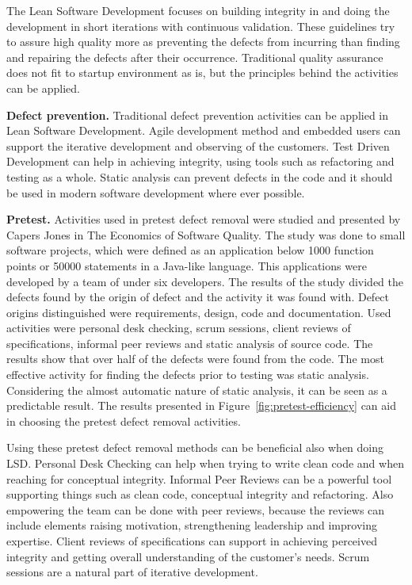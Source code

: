 
The Lean Software Development focuses on building integrity in and doing the development in short iterations with continuous validation. These guidelines try to assure high quality more as preventing the defects from incurring than finding and repairing the defects after their occurrence. Traditional quality assurance does not fit to startup environment as is, but the principles behind the activities can be applied.

\textbf{Defect prevention.} Traditional defect prevention activities can be applied in Lean Software Development. Agile development method and embedded users can support the iterative development and observing of the customers. Test Driven Development can help in achieving integrity, using tools such as refactoring and testing as a whole. Static analysis can prevent defects in the code and it should be used in modern software development where ever possible.

\textbf{Pretest.} Activities used in pretest defect removal were studied and presented by Capers Jones in The Economics of Software Quality. The study was done to small software projects, which were defined as an application below 1000 function points or 50000 statements in a Java-like language. This applications were developed by a team of under six developers. The results of the study divided the defects found by the origin of defect and the activity it was found with. Defect origins distinguished were requirements, design, code and documentation. Used activities were personal desk checking, scrum sessions, client reviews of specifications, informal peer reviews and static analysis of source code. The results show that over half of the defects were found from the code. The most effective activity for finding the defects prior to testing was static analysis. Considering the almost automatic nature of static analysis, it can be seen as a predictable result. The results presented in Figure~\ref{fig:pretest-efficiency} can aid in choosing the pretest defect removal activities.\cite{jones2011economics}

Using these pretest defect removal methods can be beneficial also when doing LSD. Personal Desk Checking can help when trying to write clean code and when reaching for conceptual integrity. Informal Peer Reviews can be a powerful tool supporting things such as clean code, conceptual integrity and refactoring. Also empowering the team can be done with peer reviews, because the reviews can include elements raising motivation, strengthening leadership and improving expertise. Client reviews of specifications can support in achieving perceived integrity and getting overall understanding of the customer's needs. Scrum sessions are a natural part of iterative development.

